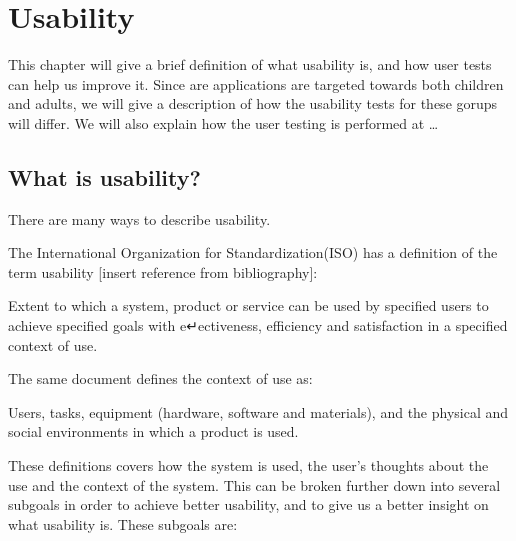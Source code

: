 \chapter{Usability}
\label{Usability}

This chapter will give a brief definition of what usability is, and how user tests can help us improve it. Since are applications are targeted towards both children and adults, we will give a description of how the usability tests for these gorups will differ. We will also explain how the user testing is performed at \ldots

\section{What is usability?}
There are many ways to describe usability. 

The International Organization for Standardization(ISO) has a definition of the term usability [insert reference from bibliography]: 

Extent to which a system, product or service can be used by specified
users to achieve specified goals with e↵ectiveness, efficiency
and satisfaction in a specified context of use.

The same document defines the context of use as:

Users, tasks, equipment (hardware, software and materials), and
the physical and social environments in which a product is used.

These definitions covers how the system is used, the user's thoughts about the use and the context of the system. This can be broken further down into several subgoals in order to achieve better usability, and to give us a better insight on what usability is. 
These subgoals are:

